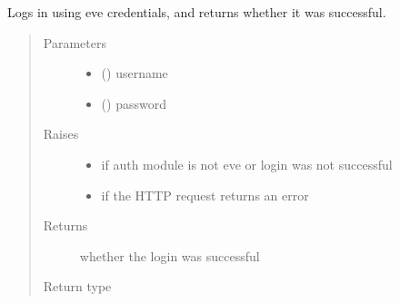 \documentclass[letterpaper,10pt,english]{sphinxmanual}
\begin{document}
\begin{fulllineitems}
\begin{fulllineitems}
\label{\detokenize{autoapi/pine/client/index:pine.client.PineClient.login_eve}}
Logs in using eve credentials, and returns whether it was successful.
\begin{quote}\begin{description}
\item[{Parameters}] \leavevmode\begin{itemize}
\item {} 
 () \textendash{} username

\item {} 
 () \textendash{} password

\end{itemize}

\item[{Raises}] \leavevmode\begin{itemize}
\item {} 
{\hyperref[\detokenize{autoapi/pine/client/exceptions/index:pine.client.exceptions.PineClientAuthException}]{}} \textendash{} if auth module is not eve or login was not successful

\item {} 
{\hyperref[\detokenize{autoapi/pine/client/exceptions/index:pine.client.exceptions.PineClientHttpException}]{}} \textendash{} if the HTTP request returns an error

\end{itemize}

\item[{Returns}] \leavevmode
whether the login was successful

\item[{Return type}] \leavevmode
{}


\end{description}
\end{quote}
\end{fulllineitems}
\end{fulllineitems}
\end{document}
